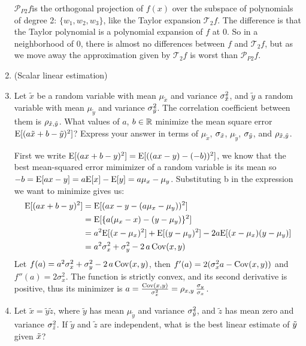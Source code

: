 \documentclass[10pt]{article}
\begin{document}
\begin{enumerate}
    $\mathcal{P}_{P2} f$is the orthogonal projection of $f(x)$ over the subspace of polynomials of degree 2: $\{ w_1, w_2, w_3 \}$, like the Taylor expansion $\mathcal{T}_2 f$. The difference is that the Taylor polynomial is a polynomial expansion of $f$ at 0. So in a neighborhood of $0$, there is almost no differences between $f$ and $\mathcal{T}_2 f$, but as we move away the approximation given by $\mathcal{T}_2 f$ is worst than  $\mathcal{P}_{P2} f$. 
\ee	

\item (Scalar linear estimation) 
\be
	\item Let $\tilde{x}$ be a random variable with mean $\mu_{\tilde{x}}$ and variance $\sigma_{\tilde{  x }}^2$, and $\tilde{y}$ a random variable with mean $\mu_{\tilde{y}}$ and variance $\sigma_{\tilde{  y }}^2$. The correlation coefficient between them is $\rho_{\tilde{  x },\tilde{  y }}$. What values of $a$, $b \in \mathbb{R}$ minimize the mean square error $\mathrm{E}[( a \tilde{x} + b - \tilde{y} )^2]$? Express your answer in terms of $\mu_{\tilde{x}}$, $\sigma_{\tilde{  x }}$, $\mu_{\tilde{y}}$, $\sigma_{\tilde{  y }}$, and $\rho_{\tilde{  x },\tilde{  y }}$.

	First we write $\mathrm{E}[(a x + b - y)^2] = \mathrm{E}[((a x -y) - (-b))^2]$, we know that the best mean-squared error mimimizer of a random variable is its mean so $-b=\mathrm{E}[ax-y] = a \mathrm{E}[x] - \mathrm{E}[y]= a \mu_x - \mu_y$.
	Substituting b in the expression we want to minimize gives us:
	\begin{align*}
		\mathrm{E}[(a x + b - y)^2] 	&= \mathrm{E}[ ( a x - y -  ( a \mu_x - \mu_y) )^2 ] \\
						&= \mathrm{E}[ \{ a (\mu_x - x)  - (y-\mu_y)  \}^2 ] \\
						&= a^2 \mathrm{E}[(x - \mu_x)^2]  + \mathrm{E}[ (y-\mu_y)^2]  -2 a \mathrm{E}[(x - \mu_x) (y-\mu_y)] \\
						&= a^2 \sigma_x^2 + \sigma_y^2 -2\, a\, \mathrm{Cov}(x,y)
	\end{align*}
	Let $f(a) =  a^2 \sigma_x^2 + \sigma_y^2 -2\, a\, \mathrm{Cov}(x,y)$, then $f'(a) = 2 (\sigma_x^2 a - \mathrm{Cov}(x,y))$ and $f''(a) = 2 \sigma_x^2 $.
	The function is strictly convex, and its second derivative is positive, thus its minimizer is $a = \frac{ \mathrm{Cov}(x,y)} {\sigma_x^2} = \rho_{x,y}\, \frac{\sigma_y}{\sigma_x}$.
	
	\item Let $\tilde{x} = \tilde{y} \tilde{z}$, where $\tilde{y}$ has mean $\mu_{\tilde{y}}$ and variance $\sigma_{\tilde{  y }}^2$, and $\tilde{z}$ has mean zero and variance $\sigma_{\tilde{ z }}^2$. If $\tilde{y}$ and $\tilde{z}$ are independent, what is the best linear estimate of $\tilde{  y }$ given $\tilde{  x }$?
	

\end{enumerate}
\end{document}
